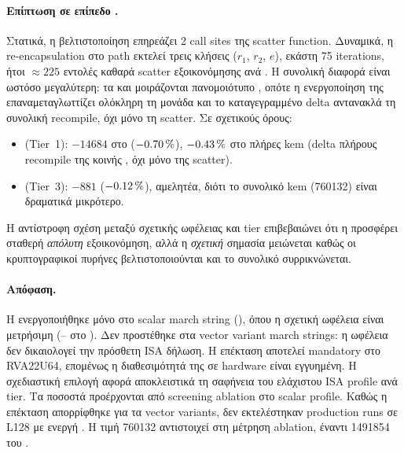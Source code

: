 \paragraph{Επίπτωση σε επίπεδο \KEM.}
Στατικά, η βελτιστοποίηση  επηρεάζει \num{2} call sites της scatter
function. Δυναμικά, η re-encapsulation στο \Decaps path εκτελεί τρεις
κλήσεις ($r_1$, $r_2$, $e$), εκάστη \num{75} iterations, ήτοι
$\approx\num{225}$ εντολές καθαρά scatter εξοικονόμησης ανά \Decaps. Η
συνολική διαφορά \instret είναι ωστόσο μεγαλύτερη: τα  και
 μοιράζονται πανομοιότυπο , οπότε η
ενεργοποίηση της  επαναμεταγλωττίζει ολόκληρη τη μονάδα και το
καταγεγραμμένο delta αντανακλά τη συνολική recompile, όχι μόνο τη scatter.
Σε σχετικούς όρους:
%
\begin{itemize}
  \item {} (Tier~1): $-\num{14684}$ \instret στο
        \Decaps ($-\SI{0.70}{\percent}$), $-\SI{0.43}{\percent}$ στο πλήρες \gls{kem}
        (delta πλήρους recompile της κοινής , όχι μόνο της
        scatter).
  \item {} (Tier~3): $-\num{881}$ \instret
        ($-\SI{0.12}{\percent}$), αμελητέα, διότι το συνολικό \gls{kem} \instret
        (\num{760132}) είναι δραματικά μικρότερο.
\end{itemize}
%
Η αντίστροφη σχέση μεταξύ σχετικής ωφέλειας και tier
επιβεβαιώνει ότι η  προσφέρει σταθερή \emph{απόλυτη}
εξοικονόμηση, αλλά η \emph{σχετική} σημασία μειώνεται καθώς οι
κρυπτογραφικοί πυρήνες βελτιστοποιούνται και το συνολικό \instret
συρρικνώνεται.

\paragraph{Απόφαση.}
Η  ενεργοποιήθηκε μόνο στο scalar march string
(), όπου η σχετική ωφέλεια είναι μετρήσιμη
(– στο \Decaps). Δεν προστέθηκε στα vector variant
march strings: η ωφέλεια  δεν δικαιολογεί την πρόσθετη ISA
δήλωση. Η επέκταση αποτελεί mandatory στο RVA22U64, επομένως η
διαθεσιμότητά της σε hardware είναι εγγυημένη. Η σχεδιαστική επιλογή
αφορά αποκλειστικά τη σαφήνεια του ελάχιστου ISA profile ανά tier. Τα ποσοστά  προέρχονται από screening ablation στο scalar profile. Καθώς η επέκταση απορρίφθηκε για τα vector variants, δεν εκτελέστηκαν production runs σε L128 με ενεργή . Η τιμή \num{760132} αντιστοιχεί στη μέτρηση ablation, έναντι \num{1491854} του .

